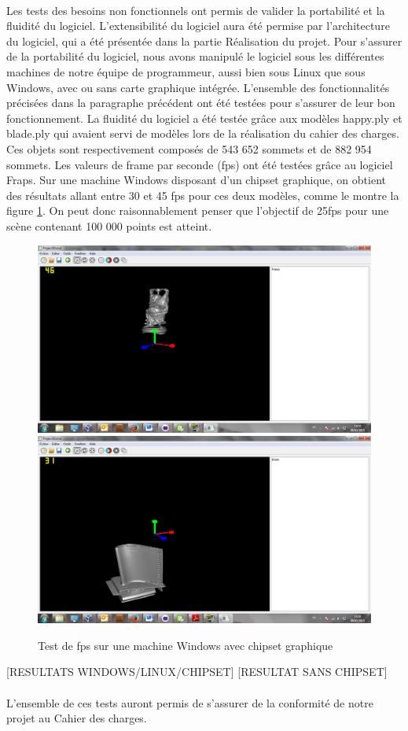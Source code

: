 \paragraph{}
Les tests des besoins non fonctionnels ont permis de valider la portabilité et la fluidité du logiciel. L'extensibilité du logiciel aura été permise par l'architecture du logiciel, qui a été présentée dans la partie Réalisation du projet.
Pour s'assurer de la portabilité du logiciel, nous avons manipulé le logiciel sous les différentes machines de notre équipe de programmeur, aussi bien sous Linux que sous Windows, avec ou sans carte graphique intégrée. L'ensemble des fonctionnalités précisées dans la paragraphe précédent ont été testées pour s'assurer de leur bon fonctionnement.
La fluidité du logiciel a été testée grâce aux modèles happy.ply et blade.ply qui avaient servi de modèles lors de la réalisation du cahier des charges. Ces objets sont respectivement composés de 543 652 sommets et de 882 954 sommets. Les valeurs de frame par seconde (fps) ont été testées grâce au logiciel Fraps\footnotemark.
Sur une machine Windows disposant d'un chipset graphique, on obtient des résultats allant entre 30 et 45 fps pour ces deux modèles, comme le montre la figure \ref{fig:fps_windows_chipset}. On peut donc raisonnablement penser que l'objectif de 25fps pour une scène contenant 100 000 points est atteint.


\begin{figure}[h]
	\centering
	\includegraphics[scale=0.3]{happy_fps.png}
        \includegraphics[scale=0.3]{blade_fps.png}
       	\caption{\label{fig:fps_windows_chipset} Test de fps sur une machine Windows avec chipset graphique\protect}
\end{figure}
[RESULTATS WINDOWS/LINUX/CHIPSET]
[RESULTAT SANS CHIPSET]

\paragraph{}
L'ensemble de ces tests auront permis de s'assurer de la conformité de notre projet au Cahier des charges. 
